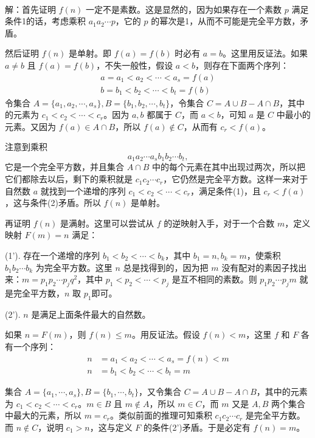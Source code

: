 ~

解：首先证明 $ f(n) $ 一定不是素数。这是显然的，因为如果存在一个素数 $ p $ 满足条件1的话，考虑乘积 $ a_1a_2\cdots p $，它的 $ p $ 的幂次是1，从而不可能是完全平方数，矛盾。

然后证明 $ f(n) $ 是单射。即 $ f(a) = f(b) $ 时必有 $ a = b $。这里用反证法。如果 $ a \neq b $ 且 $ f(a) = f(b) $，不失一般性，假设 $ a < b $，则存在下面两个序列：
\begin{align*}
a = a_1 < a_2 < \cdots < a_s = f(a) \\
b = b_1 < b_2 < \cdots < b_t = f(b)
\end{align*}
令集合 $ A = \{a_1, a_2, \cdots, a_s\}, B = \{b_1, b_2, \cdots, b_t\} $，令集合 $ C = A\cup B - A\cap B $，其中的元素为 $ c_1 < c_2 < \cdots < c_r $。因为 $ a,b $ 都属于 $ C $，而 $ a < b $，可知 $ a $ 是 $ C $ 中最小的元素。又因为 $ f(a) \in A\cap B $，所以 $ f(a) \notin C $，从而有 $ c_r < f(a) $。

注意到乘积 
\[
a_1a_2\cdots a_sb_1b_2\cdots b_t,
\]
它是一个完全平方数，并且集合 $ A\cap B $ 中的每个元素在其中出现过两次，所以把它们都除去以后，剩下的乘积就是 $ c_1c_2\cdots c_r $，它仍然是完全平方数。这样一来对于自然数 $ a $ 就找到一个递增的序列 $ c_1 < c_2 < \cdots < c_r $，满足条件(1)，且 $ c_r < f(a) $，这与条件(2)矛盾。所以 $ f(n) $ 是单射。

再证明 $ f(n) $ 是满射。这里可以尝试从 $ f $ 的逆映射入手，对于一个合数 $ m $，定义映射 $ F(m)=n $ 满足：

(1'). 存在一个递增的序列 $ b_1 < b_2 < \cdots < b_k $，其中 $ b_1 = n, b_k = m $，使乘积 $ b_1b_2\cdots b_k $ 为完全平方数。这里 $ n $ 总是找得到的，因为把 $ m $ 没有配对的素因子找出来：$ m=p_1p_2\cdots p_j q^2 $，其中 $ p_1<p_2<\cdots<p_j $ 是互不相同的素数。则 $ p_1p_2\cdots p_jm $ 就是完全平方数，$ n $ 取 $ p_1 $即可。

(2'). $ n $ 是满足上面条件最大的自然数。

如果 $ n = F(m) $，则 $ f(n) \le m $。用反证法。假设 $ f(n) < m $，这里 $ f $ 和 $ F $ 各有一个序列：
\begin{align*}
n&=a_1<a_2<\cdots < a_s = f(n) < m \\ 
n&=b_1<b_2<\cdots < b_t = m
\end{align*}

集合 $ A = \{a_1,\cdots,a_s\}, B = \{b_1,\cdots,b_t\}$，又令集合 $ C = A\cup B - A\cap B $，其中的元素为 $ c_1 < c_2 < \cdots < c_r $。$ m\in B $ 且 $ m\notin A $，所以 $ m \in C $，而 $ m $ 又是 $ A,B $ 两个集合中最大的元素，所以 $ m = c_r$。类似前面的推理可知乘积 $ c_1c_2\cdots c_r $ 是完全平方数。而 $ n \notin C $，说明 $ c_1 > n $，这与定义 $ F $ 的条件(2')矛盾。于是必定有 $ f(n) = m $。

